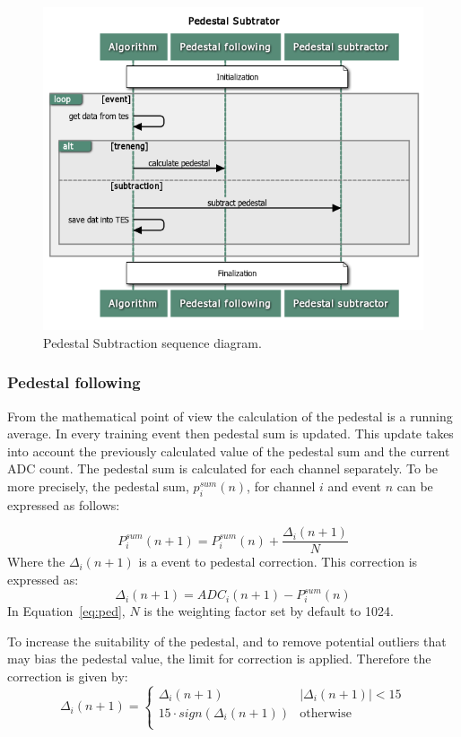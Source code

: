 \begin{figure}
\centering
\includegraphics[scale=0.6]{figures/Pedestal_Subtrator.png}
\caption{Pedestal Subtraction sequence diagram.}
\label{fig:ped}
\end{figure}



\subsubsection{Pedestal following}
From the mathematical point of view the calculation of the pedestal is a running average. In every training event then pedestal sum is updated. This update takes into account the previously calculated value of the pedestal sum and the current ADC count. The pedestal sum is calculated for each channel separately. To be more precisely, the pedestal sum, $p^{sum}_i(n)$, for channel $i$ and event $n$ can be expressed as follows:

\begin{equation}
P_{i}^{sum}(n+1)=P^{sum}_{i}(n) + \frac{\Delta_{i}(n+1)}{N}
\label{eq:ped}
\end{equation}
Where the $\Delta_{i}(n+1)$ is a event to pedestal correction. This correction is expressed as:
\begin{equation}
\Delta_{i}(n+1)=ADC_{i}(n+1)-P^{sum}_{i}(n)
\end{equation}
In Equation~\ref{eq:ped}, $N$ is the weighting factor set by default to 1024. 


To increase the suitability of the pedestal, and to remove potential outliers that may bias the pedestal value, the limit for correction is applied. Therefore the correction is given by:
\begin{equation} 
\Delta_{i}(n+1) =\left\{ \begin{array}{ll}
\Delta_{i}(n+1) & \left| \Delta_{i}(n+1) \right|<15 \\
 15 \cdot sign\left(\Delta_{i}(n+1)\right) & \textrm{otherwise}\\
\end{array} \right.
\end{equation}

